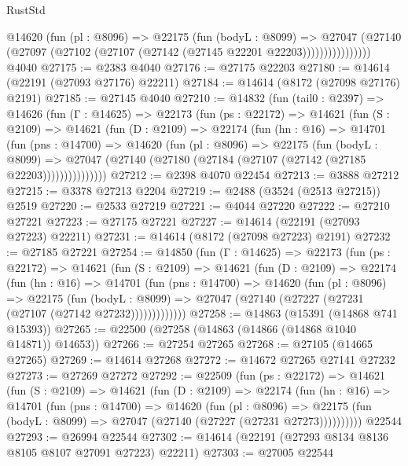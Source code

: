 \begin{lexlean}{RustStd}
\begin{coremodule}
                  @14620
                    (fun (pl : @8096) =>
                    @22175
                      (fun (bodyL : @8099) =>
                      @27047
                        (@27140
                          (@27097 (@27102 (@27107 (@27142 (@27145 @22201 @22203))))))))))))))))
    @4040
@27175 := @2383 @4040
@27176 := @27175 @22203
@27180 := @14614 (@22191 (@27093 @27176) @22211)
@27184 := @14614 (@8172 (@27098 @27176) @2191)
@27185 := @27145 @4040
@27210 := @14832
    (fun (tail0 : @2397) =>
    @14626
      (fun (Γ : @14625) =>
      @22173
        (fun (ps : @22172) =>
        @14621
          (fun (S : @2109) =>
          @14621
            (fun (D : @2109) =>
            @22174
              (fun (hn : @16) =>
              @14701
                (fun (pns : @14700) =>
                @14620
                  (fun (pl : @8096) =>
                  @22175
                    (fun (bodyL : @8099) =>
                    @27047 (@27140 (@27180 (@27184 (@27107 (@27142 (@27185 @22203)))))))))))))))
@27212 := @2398 @4070 @22454
@27213 := @3888 @27212
@27215 := @3378 @27213 @2204
@27219 := @2488 (@3524 (@2513 @27215)) @2519
@27220 := @2533 @27219
@27221 := @4044 @27220
@27222 := @27210 @27221
@27223 := @27175 @27221
@27227 := @14614 (@22191 (@27093 @27223) @22211)
@27231 := @14614 (@8172 (@27098 @27223) @2191)
@27232 := @27185 @27221
@27254 := @14850
    (fun (Γ : @14625) =>
    @22173
      (fun (ps : @22172) =>
      @14621
        (fun (S : @2109) =>
        @14621
          (fun (D : @2109) =>
          @22174
            (fun (hn : @16) =>
            @14701
              (fun (pns : @14700) =>
              @14620
                (fun (pl : @8096) =>
                @22175
                  (fun (bodyL : @8099) =>
                  @27047 (@27140 (@27227 (@27231 (@27107 (@27142 @27232)))))))))))))
@27258 := @14863 (@15391 (@14868 @741 @15393))
@27265 := @22500 (@27258 (@14863 (@14866 (@14868 @1040 @14871)) @14653))
@27266 := @27254 @27265
@27268 := @27105 (@14665 @27265)
@27269 := @14614 @27268
@27272 := @14672 @27265 @27141 @27232
@27273 := @27269 @27272
@27292 := @22509
    (fun (ps : @22172) =>
    @14621
      (fun (S : @2109) =>
      @14621
        (fun (D : @2109) =>
        @22174
          (fun (hn : @16) =>
          @14701
            (fun (pns : @14700) =>
            @14620
              (fun (pl : @8096) =>
              @22175 (fun (bodyL : @8099) => @27047 (@27140 (@27227 (@27231 @27273))))))))))
    @22544
@27293 := @26994 @22544
@27302 := @14614 (@22191 (@27293 @8134 @8136 @8105 @8107 @27091 @27223) @22211)
@27303 := @27005 @22544

\end{coremodule}
\end{lexlean}
